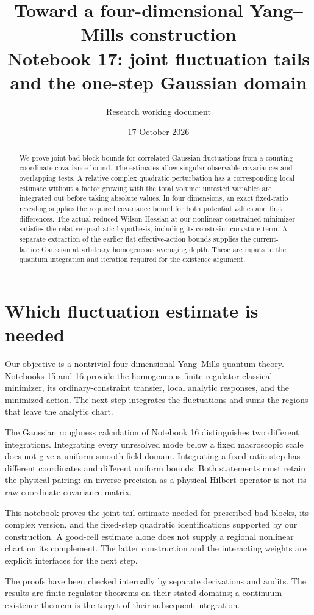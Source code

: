\documentclass[11pt]{article}
\title{Toward a four-dimensional Yang--Mills construction\\
\large Notebook 17: joint fluctuation tails and the one-step Gaussian domain}
\author{Research working document}
\date{17 October 2026}
\theoremstyle{remark}
\begin{document}
\maketitle
\begin{abstract}
We prove joint bad-block bounds for correlated Gaussian fluctuations
from a counting-coordinate covariance bound. The estimates allow
singular observable covariances and overlapping tests. A relative
complex quadratic perturbation has a corresponding local estimate
without a factor growing with the total volume: untested variables
are integrated out before taking absolute values. In four dimensions,
an exact fixed-ratio rescaling supplies the required covariance bound
for both potential values and first differences. The actual reduced
Wilson Hessian at our nonlinear constrained minimizer satisfies the
relative quadratic hypothesis, including its constraint-curvature
term. A separate extraction of the earlier flat effective-action
bounds supplies the current-lattice Gaussian at arbitrary homogeneous
averaging depth. These are inputs to the quantum integration and
iteration required for the existence argument.
\end{abstract}

\section{Which fluctuation estimate is needed}
\label{gs17-target}

Our objective is a nontrivial four-dimensional Yang--Mills quantum
theory. Notebooks 15 and 16 provide the homogeneous finite-regulator
classical minimizer, its ordinary-constraint transfer, local analytic
responses, and the minimized action. The next step integrates the
fluctuations and sums the regions that leave the analytic chart.

The Gaussian roughness calculation of Notebook 16 distinguishes two
different integrations. Integrating every unresolved mode below a
fixed macroscopic scale does not give a uniform smooth-field domain.
Integrating a fixed-ratio step has different coordinates and different
uniform bounds. Both statements must retain the physical pairing:
an inverse precision as a physical Hilbert operator is not its raw
coordinate covariance matrix.

This notebook proves the joint tail estimate needed for prescribed
bad blocks, its complex version, and the fixed-step quadratic
identifications supported by our construction. A good-cell estimate
alone does not supply a regional nonlinear chart on its complement.
The latter construction and the interacting weights are explicit
interfaces for the next step.

The proofs have been checked internally by separate derivations and
audits. The results are finite-regulator theorems on their stated
domains; a continuum existence theorem is the target of their
subsequent integration.
\end{document}
